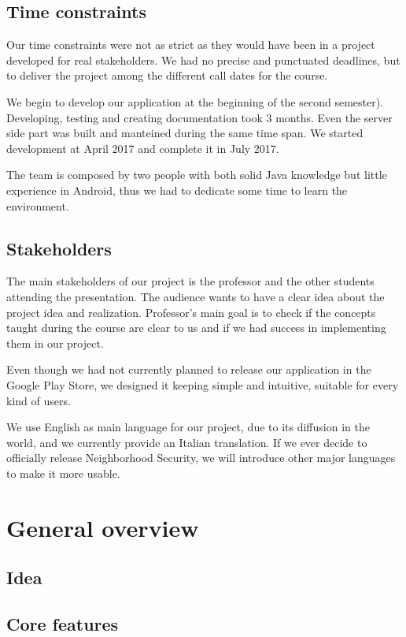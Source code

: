 \documentclass[a4paper]{scrreprt}
\begin{document}
\section{Time constraints}
Our time constraints were not as strict as they would have been in a project developed for real stakeholders. We had no precise and punctuated deadlines, but to deliver the project among the different call dates for the course.
\par We begin to develop our application at the beginning of the second semester). Developing, testing and creating documentation took 3 months. Even the server side part was built and manteined during the same time span. We started development at April 2017 and complete it in July 2017.
\par The team is composed by two people with both solid Java knowledge but little experience in Android, thus we had to dedicate some time to learn the environment.

\section{Stakeholders}
The main stakeholders of our project is the professor and the other students attending the presentation. The audience wants to have a clear idea about the project idea and realization. Professor's main goal is to check if the concepts taught during the course are clear to us and if we had success in implementing them in our project.
\par Even though we had not currently planned to release our application in the Google Play Store, we designed it keeping simple and intuitive, suitable for every kind of users.
\par We use English as main language for our project, due to its diffusion in the world, and we currently provide an Italian translation. If we ever decide to officially release Neighborhood Security, we will introduce other major languages to make it more usable.

\chapter{General overview}

\section{Idea}

\section{Core features}
\end{document}
